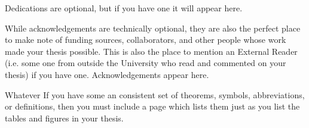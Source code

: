\begin{dedication}
Dedications are optional, but if you have one it will appear here.
\end{dedication}

\begin{acknowledgements}
While acknowledgements are technically optional, they are also the perfect place to make note of funding sources, collaborators, and other people whose work made your thesis possible.  This is also the place to mention an External Reader (i.e. some one from outside the University who read and commented on your thesis) if you have one.  Acknowledgements appear here.
\end{acknowledgements}

\tableofcontents
\listoftables
\listoffigures

\begin{thesislist}{Whatever}
If you have some an consistent set of theorems, symbols, abbreviations, or definitions, then you must include a page which lists them just as you list the tables and figures in your thesis.
\end{thesislist}

\mainmatter

\endinput